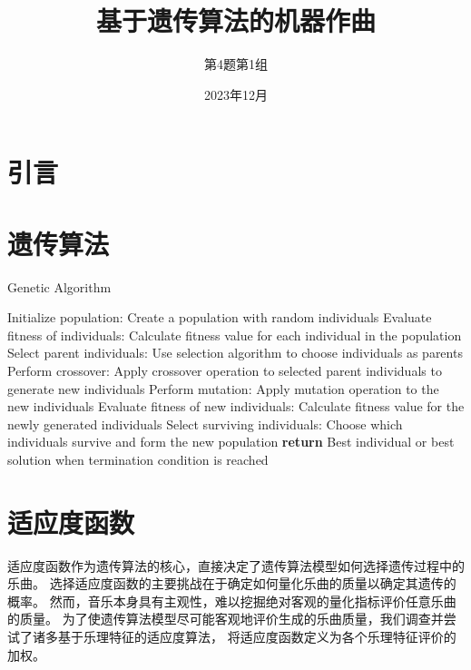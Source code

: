 \documentclass{article}
\title{基于遗传算法的机器作曲}
\author{第4题第1组}
\date{2023年12月}
\begin{document}
\maketitle

\begin{abstract}
    
\end{abstract}
\newpage
\tableofcontents
\newpage
{}
\section{引言}

\section{遗传算法}
\begin{algorithm}
    \caption{Genetic Algorithm}
    \begin{algorithmic}[1]
    \STATE Initialize population:
        \STATE Create a population with random individuals
    \STATE Evaluate fitness of individuals:
        \STATE Calculate fitness value for each individual in the population
    \REPEAT
        \STATE Select parent individuals:
            \STATE Use selection algorithm to choose individuals as parents
        \STATE Perform crossover:
            \STATE Apply crossover operation to selected parent individuals to generate new individuals
        \STATE Perform mutation:
            \STATE Apply mutation operation to the new individuals
        \STATE Evaluate fitness of new individuals:
            \STATE Calculate fitness value for the newly generated individuals
        \STATE Select surviving individuals:
            \STATE Choose which individuals survive and form the new population
    \STATE \textbf{return} Best individual or best solution when termination condition is reached
    \end{algorithmic}
    \end{algorithm}


\section{适应度函数}
适应度函数作为遗传算法的核心，直接决定了遗传算法模型如何选择遗传过程中的乐曲。
选择适应度函数的主要挑战在于确定如何量化乐曲的质量以确定其遗传的概率。
然而，音乐本身具有主观性，难以挖掘绝对客观的量化指标评价任意乐曲的质量。
为了使遗传算法模型尽可能客观地评价生成的乐曲质量，我们调查并尝试了诸多基于乐理特征的适应度算法，
将适应度函数定义为各个乐理特征评价的加权。
\end{document}
